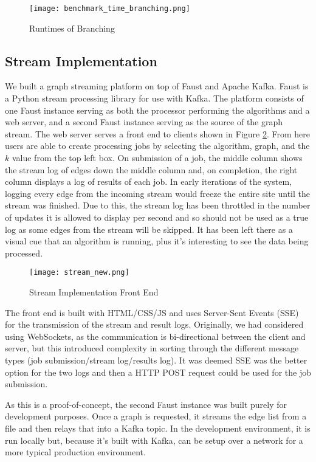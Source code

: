 \begin{figure}[H]
    \centering
    \texttt{[image: benchmark\_time\_branching.png]}
    \caption{Runtimes of Branching}
    \label{fig:benchmark_time_branching}
\end{figure}

\subsection{Stream Implementation}

We built a graph streaming platform on top of Faust and Apache Kafka. Faust is
a Python stream processing library for use with Kafka. The platform consists of
one Faust instance serving as both the processor performing the algorithms and
a web server, and a second Faust instance serving as the source of the graph
stream. The web server serves a front end to clients shown in Figure
\ref{fig:stream_font_end}. From here users are able to create processing jobs
by selecting the algorithm, graph, and the \(k\) value from the top left box.
On submission of a job, the middle column shows the stream log of edges down
the middle column and, on completion, the right column displays a log of
results of each job. In early iterations of the system, logging every edge from
the incoming stream would freeze the entire site until the stream was finished.
Due to this, the stream log has been throttled in the number of updates it is
allowed to display per second and so should not be used as a true log as some
edges from the stream will be skipped. It has been left there as a visual cue
that an algorithm is running, plus it's interesting to see the data being
processed.

\begin{figure}[htb]
    \centering
    \texttt{[image: stream\_new.png]}
    \caption{Stream Implementation Front End}
    \label{fig:stream_font_end}
\end{figure}

The front end is built with HTML/CSS/JS and uses Server-Sent Events (SSE) for
the transmission of the stream and result logs. Originally, we had considered
using WebSockets, as the communication is bi-directional between the client and
server, but this introduced complexity in sorting through the different message
types (job submission/stream log/results log). It was deemed SSE was the better
option for the two logs and then a HTTP POST request could be used for the job
submission.

As this is a proof-of-concept, the second Faust instance was built purely for
development purposes. Once a graph is requested, it streams the edge list from
a file and then relays that into a Kafka topic. In the development environment,
it is run locally but, because it's built with Kafka, can be setup over a
network for a more typical production environment.

